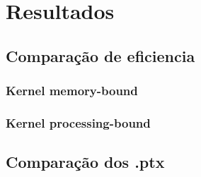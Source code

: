 \section{Resultados}
\subsection{Comparação de eficiencia}
\subsubsection{Kernel memory-bound}
\subsubsection{Kernel processing-bound}
\subsection{Comparação dos .ptx}
